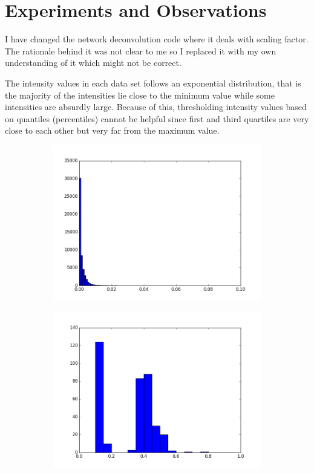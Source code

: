 \documentclass{article}
\begin{document}
\section{Experiments and Observations}
I have changed the network deconvolution code where it deals
with scaling factor. The rationale behind it was not clear to me
so I replaced it with my own understanding of it which might not 
be correct.

The intensity values in each data set follows an exponential
distribution, that is the majority of the intensities lie
close to the minimum value while some intensities are absurdly
large.
Because of this, thresholding intensity values based on quantiles (percentiles)
cannot be helpful since first and third quartiles are very close to each other
but very far from the maximum value.
\begin{figure}[H]
    \centering
    \begin{subfigure}[b]{.45\textwidth} 
        \includegraphics[width=\textwidth]{figures/hist01.png}
        \caption{}
        \label{fig:hist01}
    \end{subfigure}
    \begin{subfigure}[b]{.45\textwidth}
        \includegraphics[width=\textwidth]{figures/hist02.png}

\end{subfigure}
\end{figure}
\end{document}

